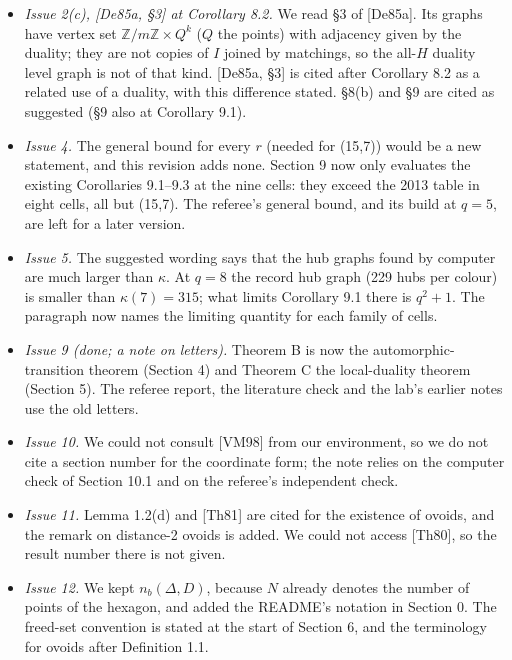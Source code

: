 \documentclass[
  11pt,
]{article}
\providecommand{\tightlist}{%
  \setlength{\itemsep}{0pt}\setlength{\parskip}{0pt}}
\begin{document}
\begin{itemize}
\tightlist
\item
  \emph{Issue 2(c), {[}De85a, §3{]} at Corollary 8.2.} We read §3 of {[}De85a{]}. Its graphs have vertex set
  \(\mathbb Z/m\mathbb Z\times Q^k\) (\(Q\) the points) with adjacency given by the duality; they are not copies of
  \(I\) joined by matchings, so the all-\(H\) duality level graph is not of that kind. {[}De85a, §3{]} is cited after
  Corollary 8.2 as a related use of a duality, with this difference stated. §8(b) and §9 are cited as suggested (§9 also
  at Corollary 9.1).
\item
  \emph{Issue 4.} The general bound for every \(r\) (needed for (15,7)) would be a new statement, and this revision adds
  none. Section 9 now only evaluates the existing Corollaries 9.1--9.3 at the nine cells: they exceed the 2013 table in
  eight cells, all but (15,7). The referee's general bound, and its build at \(q = 5\), are left for a later version.
\item
  \emph{Issue 5.} The suggested wording says that the hub graphs found by computer are much larger than \(\kappa\). At
  \(q = 8\) the record hub graph (229 hubs per colour) is smaller than \(\kappa(7) = 315\); what limits Corollary 9.1
  there is \(q^2+1\). The paragraph now names the limiting quantity for each family of cells.
\item
  \emph{Issue 9 (done; a note on letters).} Theorem B is now the automorphic-transition theorem (Section 4) and Theorem
  C the local-duality theorem (Section 5). The referee report, the literature check and the lab's earlier notes use the
  old letters.
\item
  \emph{Issue 10.} We could not consult {[}VM98{]} from our environment, so we do not cite a section number for the
  coordinate form; the note relies on the computer check of Section 10.1 and on the referee's independent check.
\item
  \emph{Issue 11.} Lemma 1.2(d) and {[}Th81{]} are cited for the existence of ovoids, and the remark on distance-2
  ovoids is added. We could not access {[}Th80{]}, so the result number there is not given.
\item
  \emph{Issue 12.} We kept \(n_b(\Delta,D)\), because \(N\) already denotes the number of points of the hexagon, and
  added the README's notation in Section 0. The freed-set convention is stated at the start of Section 6, and the
  terminology for ovoids after Definition 1.1.
\end{itemize}
\end{document}

